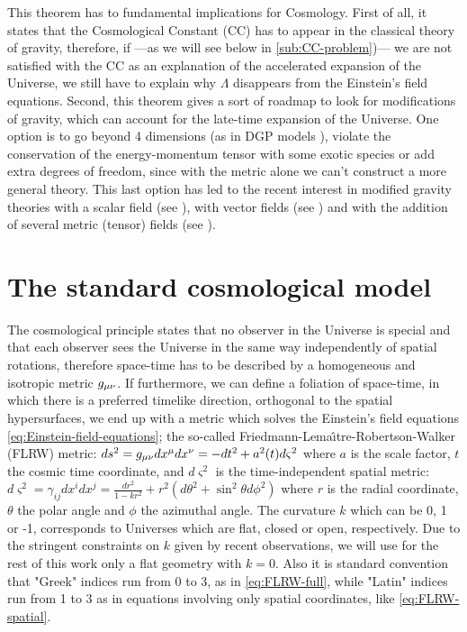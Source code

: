 This theorem has to fundamental implications for Cosmology.
First of all, it states that the Cosmological Constant (CC) has to appear in the classical theory of gravity,
therefore, if ---as we will see below in \cref{sub:CC-problem})--- we are not satisfied with the CC as an explanation
of the accelerated expansion of the Universe, we still have to explain why $\Lambda$ disappears from the Einstein's field equations.
Second, this theorem gives a sort of roadmap to look for modifications of gravity, which can account for the late-time expansion of the Universe.
One option is to go beyond 4 dimensions (as in DGP models \cite{DGP models}),
violate the conservation of the energy-momentum tensor with some exotic species or
add extra degrees of freedom, since with the metric alone we can't construct a more general theory.
This last option has led to the recent interest in modified gravity theories with a scalar field (see \cite{cite some scalar field}), 
with vector fields (see \cite{cite}) and with the addition of several metric (tensor) fields (see \cite{cite}). 



\section{The standard cosmological model \label{sec:Standard-LCDM}}

The cosmological principle states
that no observer in the Universe is special and that each observer sees the Universe in the same way independently of
spatial rotations, therefore space-time has to be described by a homogeneous and isotropic metric $g_{\mu \nu}$.
If furthermore, we can define a foliation of space-time, in which there is a preferred timelike direction, orthogonal
to the spatial hypersurfaces, we end up with a metric which solves the Einstein's field equations \ref{eq:Einstein-field-equations};
the so-called Friedmann-Lema\^{\i}tre-Robertson-Walker (FLRW) metric:
\beeqc$\label{eq:FLRW-full}
ds^2 = g_{\mu \nu} dx^\mu dx^\nu = -dt^2 + a^2 (t) d\varsigma^2 
$
where $a$ is the scale factor, $t$ the cosmic time coordinate, and $d\varsigma^2$ is the time-independent spatial metric:
\beeqc$\label{eq:FLRW-spatial}
d\varsigma^2  = \gamma_{i j} dx^i dx^j = \frac{dr^2}{1-kr^2} + r^2(d\theta^2 + \sin^2 \theta d \phi^2)
$ 
where $r$ is the radial coordinate, $\theta$ the polar angle and $\phi$ the azimuthal angle.
The curvature $k$ which can be 0, 1 or -1, corresponds to Universes which are flat, closed or open, respectively.
Due to the stringent constraints on $k$ given by recent observations,
we will use for the rest of this work only a flat geometry with $k=0$.
Also it is standard convention that "Greek" indices run from 0 to 3, as in \cref{eq:FLRW-full},
while "Latin" indices run from 1 to 3 as in equations involving only spatial coordinates, like \cref{eq:FLRW-spatial}.




